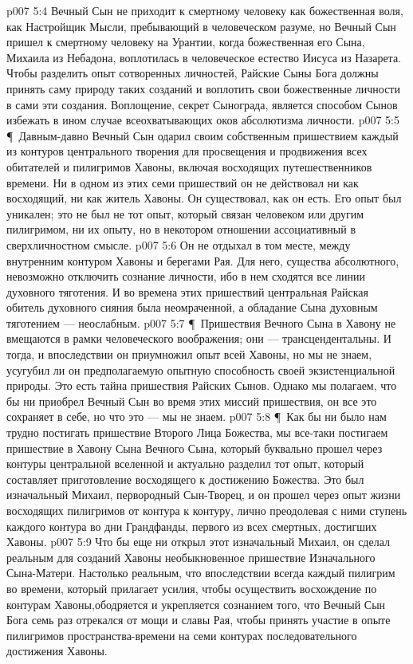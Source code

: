 \vs p007 5:4 Вечный Сын не приходит к смертному человеку как божественная воля, как Настройщик Мысли, пребывающий в человеческом разуме, но Вечный Сын пришел к смертному человеку на Урантии, когда божественная  его Сына, Михаила из Небадона, воплотилась в человеческое естество Иисуса из Назарета. Чтобы разделить опыт сотворенных личностей, Райские Сыны Бога должны принять саму природу таких созданий и воплотить свои божественные личности в сами эти создания. Воплощение, секрет Сынограда, является способом Сынов избежать в ином случае всеохватывающих оков абсолютизма личности.
\vs p007 5:5 \P\ Давным\hyp{}давно Вечный Сын одарил своим собственным пришествием каждый из контуров центрального творения для просвещения и продвижения всех обитателей и пилигримов Хавоны, включая восходящих путешественников времени. Ни в одном из этих семи пришествий он не действовал ни как восходящий, ни как житель Хавоны. Он существовал, как он есть. Его опыт был уникален; это не был не тот опыт, который связан человеком или другим пилигримом, ни  их опыту, но в некотором отношении ассоциативный в сверхличностном смысле.
\vs p007 5:6 Он не отдыхал в том месте, между внутренним контуром Хавоны и берегами Рая. Для него, существа абсолютного, невозможно отключить сознание личности, ибо в нем сходятся все линии духовного тяготения. И во времена этих пришествий центральная Райская обитель духовного сияния была неомраченной, а обладание Сына духовным тяготением --- неослабным.
\vs p007 5:7 \P\ Пришествия Вечного Сына в Хавону не вмещаются в рамки человеческого воображения; они --- трансцендентальны. И тогда, и впоследствии он приумножил опыт всей Хавоны, но мы не знаем, усугубил ли он предполагаемую опытную способность своей экзистенциальной природы. Это есть тайна пришествия Райских Сынов. Однако мы полагаем, что бы ни приобрел Вечный Сын во время этих миссий пришествия, он все это сохраняет в себе, но что это --- мы не знаем.
\vs p007 5:8 \P\ Как бы ни было нам трудно постигать пришествие Второго Лица Божества, мы все\hyp{}таки постигаем пришествие в Хавону Сына Вечного Сына, который буквально прошел через контуры центральной вселенной и актуально разделил тот опыт, который составляет приготовление восходящего к достижению Божества. Это был изначальный Михаил, первородный Сын\hyp{}Творец, и он прошел через опыт жизни восходящих пилигримов от контура к контуру, лично преодолевая с ними ступень каждого контура во дни Грандфанды, первого из всех смертных, достигших Хавоны.
\vs p007 5:9 Что бы еще ни открыл этот изначальный Михаил, он сделал реальным для созданий Хавоны необыкновенное пришествие Изначального Сына\hyp{}Матери. Настолько реальным, что впоследствии всегда каждый пилигрим во времени, который прилагает усилия, чтобы осуществить восхождение по контурам Хавоны,ободряется и укрепляется сознанием того, что Вечный Сын Бога семь раз отрекался от мощи и славы Рая, чтобы принять участие в опыте пилигримов пространства\hyp{}времени на семи контурах последовательного достижения Хавоны.

